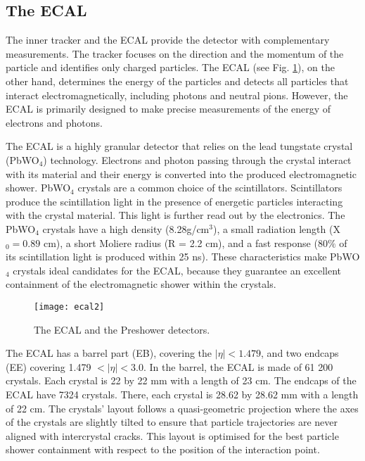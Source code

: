 \begin{normalsize}


\subsection{The ECAL}


The inner tracker and the ECAL provide the detector with complementary measurements. The tracker focuses on the direction and the momentum of the particle and identifies only charged particles. The ECAL  \cite{ECAL_attendum} (see Fig. \ref{ecal2}), on the other hand, determines the energy of the particles and detects all particles that interact electromagnetically, including photons and neutral pions. However, the ECAL is primarily designed to make precise measurements of the energy of electrons and photons. 

The ECAL is a highly granular detector that relies on the lead tungstate crystal (PbWO$_4$) technology. Electrons and photon passing through the crystal interact with its material and their energy is converted into the produced electromagnetic shower. PbWO$_4$ crystals are a common choice of the scintillators. Scintillators produce the scintillation light in the presence of energetic particles interacting with the crystal material. This light is further read out by the electronics. The PbWO$_4$ crystals have a high density (8.28g/cm$^3$), a small radiation length (X$_0 = 0.89$ cm), a short Moliere radius (R = 2.2 cm), and a fast response (80$\%$ of its scintillation light is produced within 25 ns). These characteristics make PbWO$_4$ crystals ideal candidates for the ECAL, because they guarantee an excellent containment of the electromagnetic shower within the crystals. 



\begin{figure}[H]
  \centering
  \texttt{[image: ecal2]}
  \caption[The ECAL]{The ECAL and the Preshower detectors.}
  \label{ecal2}
\end{figure}

The ECAL has a barrel part (EB), covering the $|\eta|< 1.479$, and two endcaps (EE) covering 1.479 $< |\eta |  < 3.0$. In the barrel, the ECAL is made of 61 200 crystals. Each crystal is 22 by 22 mm with a length of 23 cm. The endcaps of the ECAL have 7324 crystals. There, each crystal is 28.62 by 28.62 mm with a length of 22 cm. The crystals' layout follows a quasi-geometric projection where the axes of the crystals are slightly tilted to ensure that particle trajectories are never aligned with intercrystal cracks. This layout is optimised for the best particle shower containment with respect to the position of the interaction point.  


\end{normalsize}
